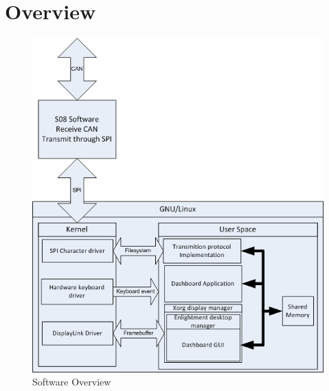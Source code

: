 \documentclass[11pt]{report} %
\begin{document}
	\section{Overview}
	\begin{figure}[H]
		\centering
		\includegraphics[scale=0.45]{images/software_diagram.png}
		\caption{Software Overview}\label{fig:software_diagram}
	\end{figure}
\end{document}
